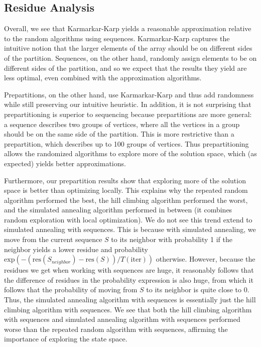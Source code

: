 \documentclass[10pt,letter]{article}
\begin{document}
\subsection{Residue Analysis}

Overall, we see that Karmarkar-Karp yields a reasonable approximation relative to the random algorithms using sequences. Karmarkar-Karp captures the intuitive notion that the larger elements of the array should be on different sides of the partition. Sequences, on the other hand, randomly assign elements to be on different sides of the partition, and so we expect that the results they yield are less optimal, even combined with the approximation algorithms.

Prepartitions, on the other hand, use Karmarkar-Karp and thus add randomness while still preserving our intuitive heuristic. In addition, it is not surprising that prepartitioning is superior to sequencing because prepartitions are more general: a sequence describes two groups of vertices, where all the vertices in a group should be on the same side of the partition. This is more restrictive than a prepartition, which describes up to 100 groups of vertices. Thus prepartitioning allows the randomized algorithms to explore more of the solution space, which (as expected) yields better approximations.

Furthermore, our prepartition results show that exploring more of the solution space is better than optimizing locally. This explains why the repeated random algorithm performed the best, the hill climbing algorithm performed the worst, and the simulated annealing algorithm performed in between (it combines random exploration with local optimization). We do not see this trend extend to simulated annealing with sequences. This is because with simulated annealing, we move from the current sequence $S$ to its neighbor with probability 1 if the neighbor yields a lower residue and probability $\mathrm{exp}(-(\mathrm{res}(S_{neighbor}) - \mathrm{res}(S))/T(\mathrm{iter}))$ otherwise. However, because the residues we get when working with sequences are huge, it reasonably follows that the difference of residues in the probability expression is also huge, from which it follows that the probability of moving from $S$ to its neighbor is quite close to 0. Thus, the simulated annealing algorithm with sequences is essentially just the hill climbing algorithm with sequences. We see that both the hill climbing algorithm with sequences and simulated annealing algorithm with sequences performed worse than the repeated random algorithm with sequences, affirming the importance of exploring the state space. 
\end{document}
